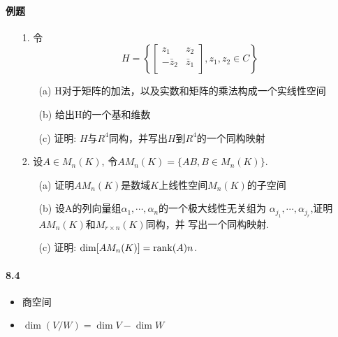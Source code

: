 \paragraph{例题}
\begin{itemize}
  \item[1.]令
  \begin{equation}
  \nonumber
  H = \left\{
    \begin{bmatrix}
      z_1& z_2\\
     -\bar{z}_2& \bar{z}_1\\
    \end{bmatrix},
    z_1, z_2 \in C
      \right\}
  \end{equation}
  \begin{itemize}
    \item[(a)] H对于矩阵的加法，以及实数和矩阵的乘法构成一个实线性空间
    \item[(b)] 给出H的一个基和维数
    \item[(c)] 证明: $H$与$R^4$同构，并写出$H$到$R^4$的一个同构映射  
  \end{itemize}
\end{itemize}
\vspace{2cm}

\begin{itemize}
  \item[2.]设$A \in M_n(K)$, 令$AM_n(K) = \{AB, B\in M_n(K) \}$.
  \begin{itemize}
    \item[(a)] 证明$AM_n(K)$是数域$K$上线性空间$M_n(K)$的子空间
    \item[(b)] 设A的列向量组$\alpha_1, \cdots, \alpha_n$的一个极大线性无关组为
    $\alpha_{j_1}, \cdots, \alpha_{j_r}$,证明$AM_n(K)$和$M_{r\times n}(K)$同构，并
    写出一个同构映射. 
    \item[(c)] 证明: $\dim [AM_n(K)] = \rank(A)n$.
  \end{itemize}
\end{itemize}
\vspace{4cm}

\paragraph{8.4}
\begin{itemize}
    \item 商空间
    \item $\dim{(V/W)} = \dim V - \dim W$
\end{itemize}

